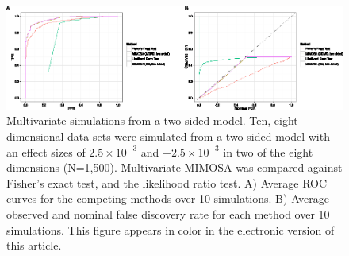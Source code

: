 \documentclass{article}
\begin{document}
\begin{figure} %
   \centering
   \includegraphics{TIKZFig5.eps}
   \caption{Multivariate simulations from a two-sided model. Ten, eight-dimensional data sets were simulated from a two-sided model with an effect sizes of $2.5\times 10^{-3}$ and $-2.5\times 10^{-3}$ in two of the eight dimensions (N=1,500). Multivariate MIMOSA was compared against Fisher's exact test, and the likelihood ratio test. A) Average ROC curves for the competing methods over 10 simulations. B) Average observed and nominal false discovery rate for each method over 10 simulations. This figure appears in color in the electronic version of this article.}
   \label{fig:mvsimulations}
\end{figure}
\end{document}
